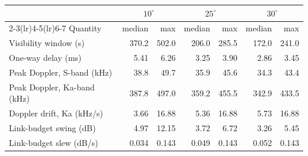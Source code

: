 \begin{tabular}{lrrrrrr}
\toprule
& \multicolumn{2}{c}{$10^\circ$} & \multicolumn{2}{c}{$25^\circ$} & \multicolumn{2}{c}{$30^\circ$} \\
\cmidrule(lr){2-3}\cmidrule(lr){4-5}\cmidrule(lr){6-7}
Quantity & median & max & median & max & median & max \\
\midrule
Visibility window (s) & 370.2 & 502.0 & 206.0 & 285.5 & 172.0 & 241.0 \\
One-way delay (ms) & 5.41 & 6.26 & 3.25 & 3.90 & 2.86 & 3.45 \\
Peak Doppler, S-band (kHz) & 38.8 & 49.7 & 35.9 & 45.6 & 34.3 & 43.4 \\
Peak Doppler, Ka-band (kHz) & 387.8 & 497.0 & 359.2 & 455.5 & 342.9 & 433.5 \\
Doppler drift, Ka (kHz/s) & 3.66 & 16.88 & 5.36 & 16.88 & 5.73 & 16.88 \\
Link-budget swing (dB) & 4.97 & 12.15 & 3.72 & 6.72 & 3.26 & 5.45 \\
Link-budget slew (dB/s) & 0.034 & 0.143 & 0.049 & 0.143 & 0.052 & 0.143 \\
\bottomrule
\end{tabular}

